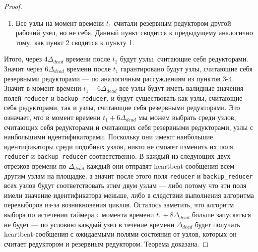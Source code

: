\documentclass{article}
\theoremstyle{plain}
\theoremstyle{plain}
\theoremstyle{plain}
\theoremstyle{plain}
\theoremstyle{definition}
\theoremstyle{remark}
\theoremstyle{plain}
\begin{document}
\begin{proof}
\begin{enumerate}
        \item Все узлы на момент времени $t_1$ считали резервным редуктором другой рабочий узел, но не себя. Данный пункт сводится к предыдущему аналогично тому, как пункт 2 сводится к пункту 1.
    \end{enumerate}
    
    Итого, через $4\Delta_{dead}$ времени после $t_1$ будут узлы, считающие себя редукторами. Значит через $6\Delta_{dead}$ времени после $t_1$ гарантировано будут узлы, считающие себя резервными редукторами --- по аналогичным рассуждениям из пунктов 3-4. Значит в момент времени $t_1 + 6\Delta_{dead}$ все узлы будут иметь валидные значения полей \texttt{reducer} и \texttt{backup\_reducer}, и будут существовать как узлы, считающие себя редукторами, так и узлы, считающие себя резервными редукторами. Это означает, что в момент времени $t_1 + 6\Delta_{dead}$ мы можем выбрать среди узлов, считающих себя редукторами и считающих себя резервными редукторами, узлы с наибольшими идентификаторами. Поскольку они имеют наибольшие идентификаторы среди подобных узлов, никто не сможет изменить их поля \texttt{reducer} и \texttt{backup\_reducer} соответственно. В каждый из следующих двух отрезков времени по $\Delta_{dead}$ каждый они отправят heartbeat-со\-об\-ще\-ния всем другим узлам на площадке, а значит после этого поля \texttt{reducer} и \texttt{backup\_reducer} всех узлов будут соответствовать этим двум узлам --- либо потому что эти поля имели значение идентификатора меньше, либо в следствии выполнения алгоритма перевыборов из-за возникновения циклов. Осталось заметить, что алгоритм выбора по истечении таймера с момента времени $t_1 + 8\Delta_{dead}$ больше запускаться не будет --- по условию каждый узел в течение времени $\Delta_{dead}$ будет получать heartbeat-со\-об\-ще\-ния с ожидаемыми полями состояния от узлов, которых он считает редуктором и резервным редуктором. Теорема доказана.
\end{proof}
\end{document}
